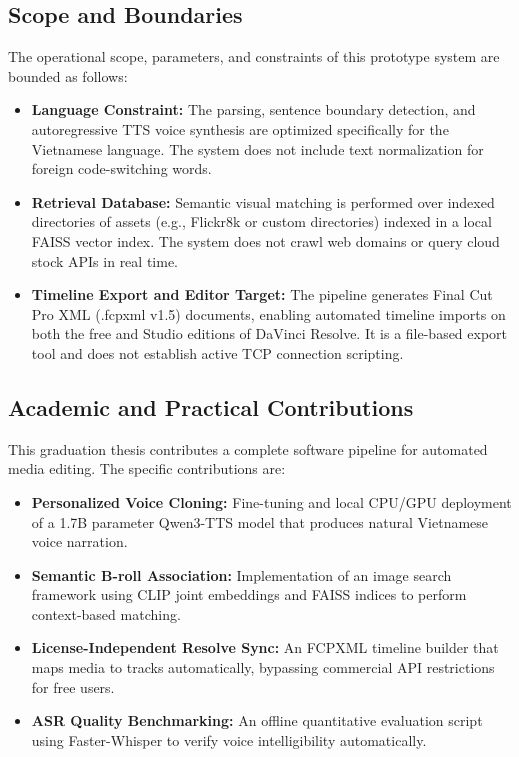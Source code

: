 \documentclass[a4paper,12pt]{report}
\begin{document}
\subsection{Scope and Boundaries}
The operational scope, parameters, and constraints of this prototype system are bounded as follows:
\begin{itemize}
    \item \textbf{Language Constraint:} The parsing, sentence boundary detection, and autoregressive TTS voice synthesis are optimized specifically for the Vietnamese language. The system does not include text normalization for foreign code-switching words.
    \item \textbf{Retrieval Database:} Semantic visual matching is performed over indexed directories of assets (e.g., Flickr8k or custom directories) indexed in a local FAISS vector index. The system does not crawl web domains or query cloud stock APIs in real time.
    \item \textbf{Timeline Export and Editor Target:} The pipeline generates Final Cut Pro XML (.fcpxml v1.5) documents, enabling automated timeline imports on both the free and Studio editions of DaVinci Resolve. It is a file-based export tool and does not establish active TCP connection scripting.
\end{itemize}

\subsection{Academic and Practical Contributions}
This graduation thesis contributes a complete software pipeline for automated media editing. The specific contributions are:
\begin{itemize}
    \item \textbf{Personalized Voice Cloning:} Fine-tuning and local CPU/GPU deployment of a 1.7B parameter Qwen3-TTS model that produces natural Vietnamese voice narration.
    \item \textbf{Semantic B-roll Association:} Implementation of an image search framework using CLIP joint embeddings and FAISS indices to perform context-based matching.
    \item \textbf{License-Independent Resolve Sync:} An FCPXML timeline builder that maps media to tracks automatically, bypassing commercial API restrictions for free users.
    \item \textbf{ASR Quality Benchmarking:} An offline quantitative evaluation script using Faster-Whisper to verify voice intelligibility automatically.
\end{itemize}
\end{document}
